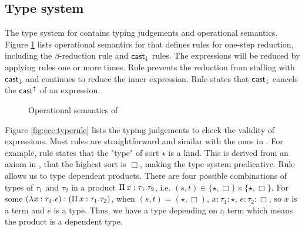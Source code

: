 \subsection{Type system}\label{sec:ecc:type}
The type system for \expcc contains typing judgements and operational semantics. Figure \ref{fig:ecc:dynsem} lists operational semantics for \expcc that defines rules for one-step reduction, including the $\beta$-reduction rule and $ \mathsf{cast}_{\downarrow} $ rules. The expressions will be reduced by applying rules one or more times. Rule  prevents the reduction from stalling with $ \mathsf{cast}_{\downarrow} $ and continues to reduce the inner expression. Rule  states that $ \mathsf{cast}_{\downarrow} $ cancels the $ \mathsf{cast}^{\uparrow} $ of an expression.

\begin{figure}[ht]
	\ottdefnstep{}
	\caption{Operational semantics of \expcc}
	\label{fig:ecc:dynsem}
\end{figure}

Figure \ref{fig:ecc:typerule} lists the typing judgements to check the validity of expressions. Most rules are straightforward and similar with the ones in \cc. For example, rule  states that the "type" of sort $ \star $ is a kind. This is derived from an axiom in \cc, that the highest sort is $ \Box $, making the type system predicative. Rule  allows us to type dependent products. There are four possible combinations of types of $\tau_{{\mathrm{1}}}$ and $\tau_{{\mathrm{2}}}$ in a product $\Pi \, \mathit{x}  :  \tau_{{\mathrm{1}}}  .  \tau_{{\mathrm{2}}}$, i.e. $(s,t) \in \{ \star ,  \Box \} \times \{ \star ,  \Box \}$. For some $(\lambda  \mathit{x}  :  \tau_{{\mathrm{1}}}  .  \mathit{e}):(\Pi \, \mathit{x}  :  \tau_{{\mathrm{1}}}  .  \tau_{{\mathrm{2}}})$, when $(s,t)=( \star , \Box )$, $x:\tau_{{\mathrm{1}}}: \star $, $e:\tau_{{\mathrm{2}}}: \Box $, so $x$ is a term and $e$ is a type. Thus, we have a type depending on a term which means the product is a dependent type.


